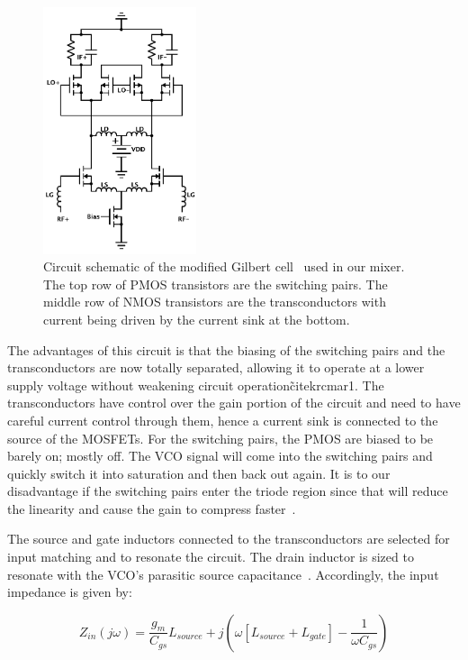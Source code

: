 \begin{figure}[h]
   \centering
    \includegraphics[width=0.40\textwidth]{figures/Mixer.pdf}
    \caption{
        Circuit schematic of the modified Gilbert cell~\cite{krcmar1} used in our mixer. The top row of PMOS transistors are the switching pairs. The middle row of NMOS transistors are the transconductors with current being driven by the current sink at the bottom.
    }
    \label{fig:mixer}
\end{figure}

The advantages of this circuit is that the biasing of the switching pairs and the transconductors are now totally separated, allowing it to operate at a lower supply voltage without weakening circuit operation\~cite{krcmar1}. The transconductors have control over the gain portion of the circuit and need to have careful current control through them, hence a current sink is connected to the source of the MOSFETs. For the switching pairs, the PMOS are biased to be barely on; mostly off.  The VCO signal will come into the switching pairs and quickly switch it into saturation and then back out again. It is to our disadvantage if the switching pairs enter the triode region since that will reduce the linearity and cause the gain to compress faster~\cite{Razavi}. 

The source and gate inductors connected to the transconductors are selected for input matching and to resonate the circuit. The drain inductor is sized to resonate with the VCO's parasitic source capacitance~\cite{krcmar1}. Accordingly, the input impedance is given by:

\begin{equation} 
  	Z_{in}(j\omega) = \frac{g_{m}}{C_{gs}}L_{source}+j(\omega[L_{source}+L_{gate}]-\frac{1}{\omega C_{gs}})
	\label{eq:mixerZin}
\end{equation}

